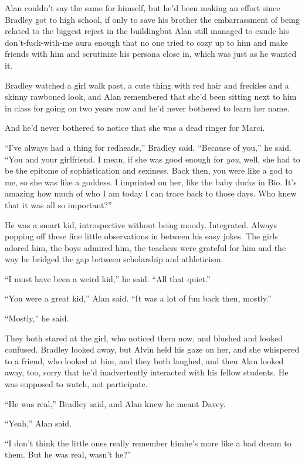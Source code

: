Alan couldn't say the same for himself, but he'd been making an effort
since Bradley got to high school, if only to save his brother the
embarrassment of being related to the biggest reject in the
building\dash{}but Alan still managed to exude his don't-fuck-with-me aura
enough that no one tried to cozy up to him and make friends with him
and scrutinize his persona close in, which was just as he wanted it.

Bradley watched a girl walk past, a cute thing with red hair and
freckles and a skinny rawboned look, and Alan remembered that she'd
been sitting next to him in class for going on two years now and he'd
never bothered to learn her name.

And he'd never bothered to notice that she was a dead ringer for
Marci.

``I've always had a thing for redheads,'' Bradley said.  ``Because of
you,'' he said.  ``You and your girlfriend.  I mean, if she was good
enough for \textit{you}, well, she had to be the epitome of
sophistication and sexiness.  Back then, you were like a god to me, so
she was like a goddess.  I imprinted on her, like the baby ducks in
Bio.  It's amazing how much of who I am today I can trace back to
those days.  Who knew that it was all so important?''

He was a smart kid, introspective without being moody.  Integrated. 
Always popping off these fine little observations in between his easy
jokes.  The girls adored him, the boys admired him, the teachers were
grateful for him and the way he bridged the gap between scholarship
and athleticism.

``I must have been a weird kid,'' he said.  ``All that quiet.''

``You were a great kid,'' Alan said.  ``It was a lot of fun back then,
mostly.''

``Mostly,'' he said.

They both stared at the girl, who noticed them now, and blushed and
looked confused.  Bradley looked away, but Alvin held his gaze on her,
and she whispered to a friend, who looked at him, and they both
laughed, and then Alan looked away, too, sorry that he'd inadvertently
interacted with his fellow students.  He was supposed to watch, not
participate.

``He was real,'' Bradley said, and Alan knew he meant Davey.

``Yeah,'' Alan said.

``I don't think the little ones really remember him\dash{}he's more like a
bad dream to them.  But he was real, wasn't he?''

